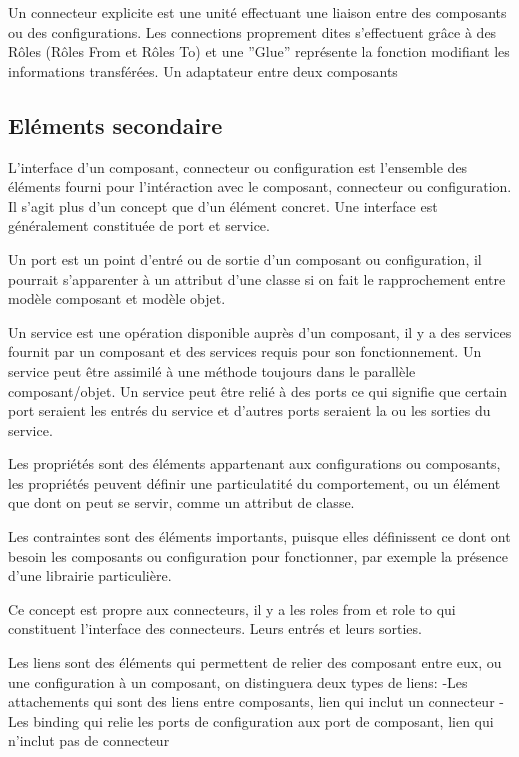 \documentclass[11pt,a4paper]{article}
\begin{document}
Un connecteur explicite est une unité effectuant une liaison entre des
composants ou des configurations. Les connections proprement dites s'effectuent
grâce à des Rôles (Rôles From et Rôles To) et une ''Glue'' représente la
fonction modifiant les informations transférées. Un adaptateur entre deux composants\\

\subsection{Eléments secondaire}

L'interface d'un composant, connecteur ou configuration est l'ensemble des éléments fourni pour l'intéraction avec le composant, connecteur ou configuration. Il s'agit plus d'un concept que d'un élément concret. Une interface est généralement constituée de port et service.

Un port est un point d'entré ou de sortie d'un composant ou configuration, il pourrait s'apparenter à un attribut d'une classe si on fait le rapprochement entre modèle composant et modèle objet.

Un service est une opération disponible auprès d'un composant, il y a des services fournit par un composant et des services requis pour son fonctionnement. Un service peut être assimilé à une méthode toujours dans le parallèle composant/objet. Un service peut être relié à des ports ce qui signifie que certain port seraient les entrés du service et d'autres ports seraient la ou les sorties du service.

Les propriétés sont des éléments appartenant aux configurations ou composants, les propriétés peuvent définir une particulatité du comportement, ou un élément que dont on peut se servir, comme un attribut de classe.

Les contraintes sont des éléments importants, puisque elles définissent ce dont ont besoin les composants ou configuration pour fonctionner,  par exemple la présence d'une librairie particulière.

Ce concept est propre aux connecteurs, il y a les roles from et role to qui constituent l'interface des connecteurs. Leurs entrés et leurs sorties.

Les liens sont des éléments qui permettent de relier des composant entre eux, ou une configuration à un composant, on distinguera deux types de liens:
-Les attachements qui sont des liens entre composants, lien qui inclut un connecteur
-Les binding qui relie les ports de configuration aux port de composant, lien qui n'inclut pas de connecteur
\end{document}
